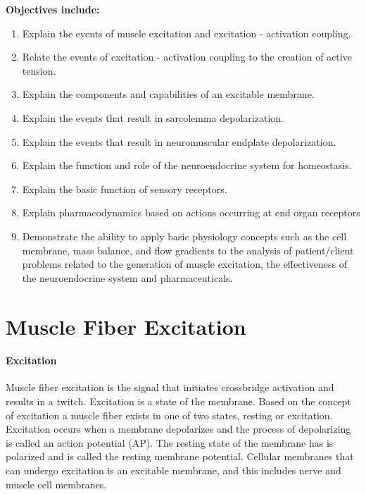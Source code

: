 \textbf{Objectives include:}
\begin{enumerate}
    \item Explain the events of muscle excitation and excitation - activation coupling.
    \item Relate the events of excitation - activation coupling to the creation of active tension.
\item Explain the components and capabilities of an excitable membrane.
    \item Explain the events that result in sarcolemma depolarization.
   \item Explain the events that result in neuromuscular endplate depolarization.
    \item Explain the function and role of the neuroendocrine system for homeostasis.
\item Explain the basic function of sensory receptors.
    \item Explain pharmacodynamics based on actions occurring at end organ receptors
   \item Demonstrate the ability to apply basic physiology concepts such as the cell membrane, mass balance, and flow gradients to the analysis of patient/client problems related to the generation of muscle excitation, the effectiveness of the neuroendocrine system and pharmaceuticals.
\end{enumerate}

\section{Muscle Fiber Excitation} %
\paragraph{Excitation}
Muscle fiber excitation is the signal that initiates crossbridge activation and results in a twitch. Excitation is a state of the membrane. Based on the concept of excitation a muscle fiber exists in one of two states, resting or excitation. Excitation occurs when a membrane depolarizes and the process of depolarizing is called an action potential (AP). The resting state of the membrane has is polarized and is called the resting membrane potential. Cellular membranes that can undergo excitation is an excitable membrane, and this includes nerve and muscle cell membranes. 
